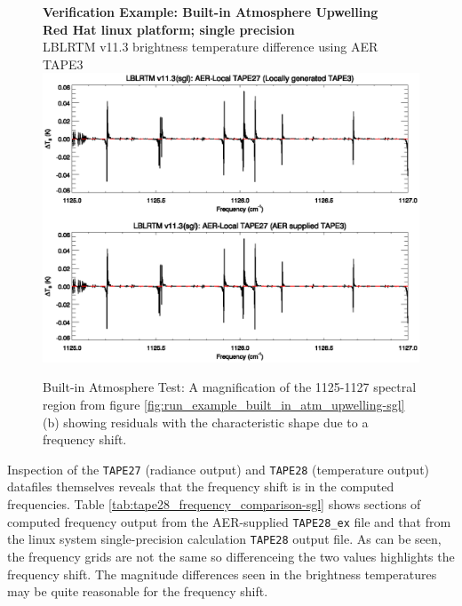 \begin{figure}[htp]
  \centering
  \qquad\sffamily\textbf{Verification Example: Built-in Atmosphere Upwelling}\\
  \qquad\sffamily\textbf{Red Hat linux platform; single precision}\\
  \qquad\textsf{LBLRTM v11.3 brightness temperature difference using AER TAPE3}
  \includegraphics[bb=80 226 534 381,clip,scale=1.0]{graphics/run_example_built_in_atm_upwelling/sgl_1125-1127.eps}
  \caption{Built-in Atmosphere Test: A magnification of the 1125-1127\invcm{} spectral region from figure \ref{fig:run_example_built_in_atm_upwelling-sgl}(b) showing residuals with the characteristic shape due to a frequency shift.}
  \label{fig:run_example_built_in_atm_upwelling-sgl_1125-1127}
\end{figure}

Inspection of the \texttt{TAPE27} (radiance output) and \texttt{TAPE28} (temperature output) datafiles themselves reveals that the frequency shift is in the computed frequencies. Table \ref{tab:tape28_frequency_comparison-sgl} shows sections of computed frequency output from the AER-supplied \texttt{TAPE28\_ex} file and that from the linux system single-precision calculation \texttt{TAPE28} output file. As can be seen, the frequency grids are not the same so differenceing the two values highlights the frequency shift. The magnitude differences seen in the brightness temperatures may be quite reasonable for the frequency shift.

